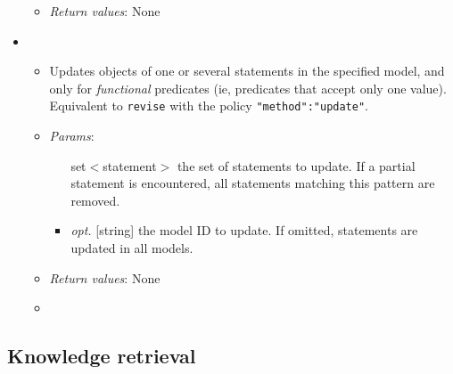 \begin{itemize}
\begin{itemize}
\item  \emph{Return values}: None
\end{itemize}

\item  {}
\begin{itemize}
\item  Updates objects of one or several statements in the specified model, and only for \emph{functional} predicates (ie, predicates that accept only one value). Equivalent to \texttt{revise} with the policy \texttt{{"method":"update"}}.
\item  \emph{Params}:
\begin{itemize}
\item  [set$<$statement$>$] the set of statements to update. If a partial statement is encountered, all statements matching this pattern are removed.
\item  \emph{opt.} [string] the model ID to update. If omitted, statements are updated in all models. 
\end{itemize}

\item  \emph{Return values}: None
\item  
\end{itemize}

\end{itemize}

\subsection{Knowledge retrieval}


